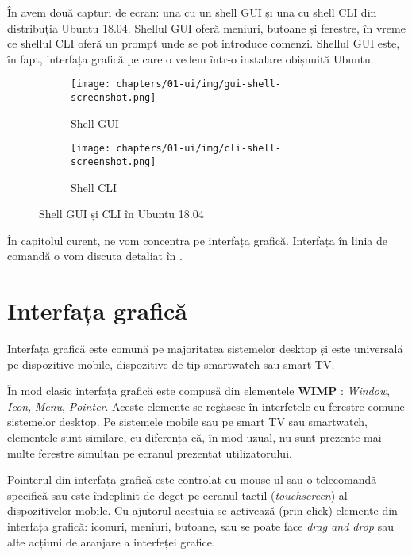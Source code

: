 În  avem două capturi de ecran: una cu un shell GUI și una cu shell CLI din distribuția Ubuntu 18.04.
Shellul GUI oferă meniuri, butoane și ferestre, în vreme ce shellul CLI oferă un prompt unde se pot introduce comenzi.
Shellul GUI este, în fapt, interfața grafică pe care o vedem într-o instalare obișnuită Ubuntu.

\begin{figure}[htbp]
  \centering
  \begin{subfigure}[b]{0.6\textwidth}
    \texttt{[image: chapters/01-ui/img/gui-shell-screenshot.png]}
    \caption{Shell GUI}
    \label{fig:ui:shell-gui-cli:gui}
  \end{subfigure}

  \begin{subfigure}[b]{0.6\textwidth}
    \texttt{[image: chapters/01-ui/img/cli-shell-screenshot.png]}
    \caption{Shell CLI}
    \label{fig:ui:shell-gui-cli:cli}
  \end{subfigure}

  \caption{Shell GUI și CLI în Ubuntu 18.04}
  \label{fig:ui:shell-gui-cli}
\end{figure}

În capitolul curent, ne vom concentra pe interfața grafică.
Interfața în linia de comandă o vom discuta detaliat în .

\section{Interfața grafică}
\label{sec:ui:gui}

Interfața grafică este comună pe majoritatea sistemelor desktop și este universală pe dispozitive mobile, dispozitive de tip smartwatch sau smart TV.

În mod clasic interfața grafică este compusă din elementele \textbf{WIMP} : \textit{Window}, \textit{Icon}, \textit{Menu}, \textit{Pointer}.
Aceste elemente se regăsesc în interfețele cu ferestre comune sistemelor desktop.
Pe sistemele mobile sau pe smart TV sau smartwatch, elementele sunt similare, cu diferența că, în mod uzual, nu sunt prezente mai multe ferestre simultan pe ecranul prezentat utilizatorului.

Pointerul din interfața grafică este controlat cu mouse-ul sau o telecomandă specifică sau este îndeplinit de deget pe ecranul tactil (\textit{touchscreen}) al dispozitivelor mobile.
Cu ajutorul acestuia se activează (prin click) elemente din interfața grafică: iconuri, meniuri, butoane, sau se poate face \textit{drag and drop} sau alte acțiuni de aranjare a interfeței grafice.

